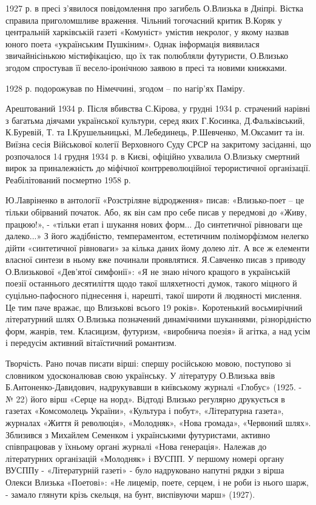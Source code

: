 1927 р. в пресі з'явилося повідомлення про загибель О.Влизька в Дніпрі. Вістка
справила приголомшливе враження. Чільний тогочасний критик В.Коряк у
центральній харківській газеті «Комуніст» умістив некролог, у якому назвав
юного поета «українським Пушкіним». Однак інформація виявилася звичайнісінькою
містифікацією, що їх так полюбляли футуристи, О.Влизько згодом спростував її
весело-іронічною заявою в пресі та новими книжками.

1928 р. подорожував по Німеччині, згодом – по нагір'ях Паміру.

Арештований 1934 р. Після вбивства С.Кірова, у грудні 1934 р. страчений нарівні
з багатьма діячами української культури, серед яких Г.Косинка, Д.Фальківський,
К.Буревій, Т. та І.Крушельницькі, М.Лебединець, Р.Шевченко, М.Оксамит та ін.
Виїзна сесія Військової колегії Верховного Суду СРСР на закритому засіданні, що
розпочалося 14 грудня 1934 р. в Києві, офіційно ухвалила О.Влизьку смертний
вирок за приналежність до міфічної контрреволюційної терористичної організації.
Реабілітований посмертно 1958 р.

Ю.Лавріненко в антології «Розстріляне відродження» писав: «Влизько-поет – це
тільки обірваний початок. Або, як він сам про себе писав у передмові до «Живу,
працюю!», - «тільки етап і шукання нових форм... До синтетичної рівноваги ще
далеко...» З його жадібністю, темпераментом, естетичним поліморфізмом нелегко
дійти «синтетичної рівноваги» за кілька даних йому долею літ. А все ж елементи
власної синтези в ньому вже починали проявлятися. Я.Савченко писав з приводу
О.Влизькової «Дев'ятої симфонії»: «Я не знаю нічого кращого в українській
поезії останнього десятиліття щодо такої шляхетності думок, такого міцного й
суцільно-пафосного піднесення і, нарешті, такої широти й людяності мислення. Це
тим паче вражає, що Влизькові всього 19 років». Коротенький восьмирічний
літературний шлях О.Влизька позначений динамічними шуканнями, різнорідністю
форм, жанрів, тем. Класицизм, футуризм, «виробнича поезія» й агітка, а над усім
і передусім активний вітаїстичний романтизм.

Творчість. Рано почав писати вірші: спершу російською мовою, поступово зі
словником удосконалював свою українську. У літературу О.Влизька ввів
Б.Антоненко-Давидович, надрукувавши в київському журналі «Глобус» (1925. - №
22) його вірш «Серце на норд». Відтоді Влизько регулярно друкується в газетах
«Комсомолець України», «Культура і побут», «Літературна газета», журналах
«Життя й революція», «Молодняк», «Нова громада», «Червоний шлях». Зблизився з
Михайлем Семенком і українськими футуристами, активно співпрацював у їхньому
органі журналі «Нова генерація». Належав до літературних організацій «Молодняк»
і ВУСПП. У першому номері органу ВУСППу - «Літературній газеті» - було
надруковано напутні рядки з вірша Олекси Влизька «Поетові»: «Не лицемір, поете,
серцем, і не роби із нього шарж, - замало глянути крізь скельця, на бунт,
виспівуючи марш» (1927).

